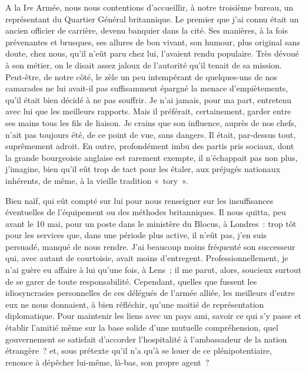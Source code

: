 \documentclass[french,twoside]{book} %
\begin{document}
A la I\emph{re} Armée, nous nous contentions d’accueillir, à notre troisième bureau, un représentant du Quartier Général britannique. Le premier que j’ai connu était un ancien officier de carrière, devenu banquier   dans la cité. Ses manières, à la fois prévenantes et brusques, ses allures de bon vivant, son humour, plus original sans doute, chez nous, qu’il n’eût paru chez lui, l’avaient rendu populaire. Très dévoué à son métier, on le disait assez jaloux de l’autorité qu’il tenait de sa mission. Peut-être, de notre côté, le zèle un peu intempérant de quelques-uns de nos camarades ne lui avait-il pas suffisamment épargné la menace d’empiètements, qu’il était bien décidé à ne pas souffrir. Je n’ai jamais, pour ma part, entretenu avec lui que les meilleurs rapports. Mais il préférait, certainement, garder entre ses mains tous les fils de liaison. Je crains que son influence, auprès de nos chefs, n’ait pas toujours été, de ce point de vue, sans dangers. Il était, par-dessus tout, suprêmement adroit. En outre, profondément imbu des partis pris sociaux, dont la grande bourgeoisie anglaise est rarement exempte, il n’échappait pas non plus, j’imagine, bien qu’il eût trop de tact pour les étaler, aux préjugés nationaux inhérents, de même, à la vieille tradition « tory ».\par
Bien naïf, qui eût compté sur lui pour nous renseigner sur les insuffisances éventuelles de l’équipement ou des méthodes britanniques. Il nous quitta, peu avant le 10 mai, pour un poste dans le ministère du Blocus, à Londres : trop tôt pour les services que, dans une période plus active, il n’eût pas, j’en suis persuadé, manqué de nous rendre. J’ai beaucoup moins fréquenté son successeur qui, avec autant de courtoisie, avait moins d’entregent. Professionnellement, je n’ai guère eu affaire à lui qu’une fois, à Lens ; il me parut, alors, soucieux surtout de se garer de toute responsabilité. Cependant, quelles que fussent les idiosyncrasies personnelles de ces délégués de l’armée alliée, les meilleurs d’entre eux ne nous donnaient, à bien réfléchir, qu’une moitié de représentation diplomatique. Pour maintenir les liens avec un pays ami, savoir ce qui s’y passe et établir l’amitié même sur la base solide d’une mutuelle   compréhension, quel gouvernement se satisfait d’accorder l’hospitalité à l’ambassadeur de la nation étrangère ? et, sous prétexte qu’il n’a qu’à se louer de ce plénipotentiaire, renonce à dépêcher lui-même, là-bas, son propre agent ?\par
\end{document}
